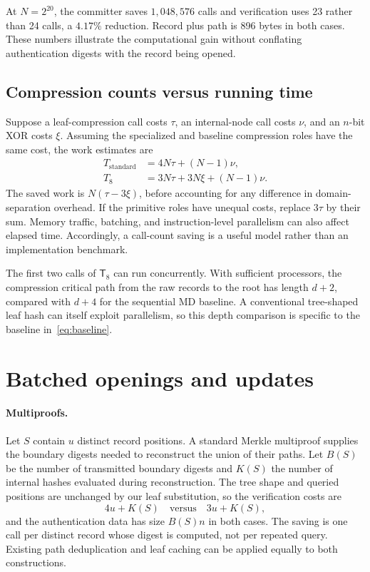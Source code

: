 \documentclass[11pt,letterpaper]{article}
\theoremstyle{definition} %
\newcommand{\Tate}{\mathsf{T}_{8}}
\begin{document}
At $N=2^{20}$, the committer saves $1{,}048{,}576$ calls and verification
uses 23 rather than 24 calls, a $4.17\%$ reduction. Record plus path is
896 bytes in both cases. These numbers illustrate the computational gain
without conflating authentication digests with the record being opened.

\subsection{Compression counts versus running time}
Suppose a leaf-compression call costs $\tau$, an internal-node call costs
$\nu$, and an $n$-bit XOR costs $\xi$. Assuming the specialized and baseline
compression roles have the same cost, the work estimates are
\begin{align}
 T_{\mathrm{standard}}&=4N\tau+(N-1)\nu,\\
 T_{8}&=3N\tau+3N\xi+(N-1)\nu.
\end{align}
The saved work is $N(\tau-3\xi)$, before accounting for any difference
in domain-separation overhead. If the primitive roles have unequal costs,
replace $3\tau$ by their sum. Memory traffic, batching, and instruction-level
parallelism can also affect elapsed time. Accordingly, a call-count saving
is a useful model rather than an implementation benchmark.

The first two calls of $\Tate$ can run concurrently. With sufficient
processors, the compression critical path from the raw records to the root
has length $d+2$, compared with $d+4$ for the sequential MD baseline. A
conventional tree-shaped leaf hash can itself exploit parallelism, so this
depth comparison is specific to the baseline in~\eqref{eq:baseline}.

\section{Batched openings and updates}
\label{sec:batch}
\paragraph{Multiproofs.}
Let $S$ contain $u$ distinct record positions. A standard Merkle multiproof
supplies the boundary digests needed to reconstruct the union of their paths.
Let $B(S)$ be the number of transmitted boundary digests and $K(S)$ the
number of internal hashes evaluated during reconstruction. The tree shape
and queried positions are unchanged by our leaf substitution, so the
verification costs are
\begin{equation}
 4u+K(S)\quad\text{versus}\quad3u+K(S),
 \label{eq:multiproof}
\end{equation}
and the authentication data has size $B(S)n$ in both cases. The saving is
one call per distinct record whose digest is computed, not per repeated
query. Existing path deduplication and leaf caching can be applied equally
to both constructions.
\end{document}
